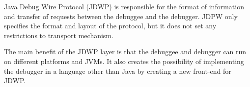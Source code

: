 \documentclass[..thesis.tex]{subfiles}
\begin{document}
Java Debug Wire Protocol (JDWP) is responsible for the format of information and transfer of requests between the debuggee and the debugger.
JDPW only specifies the format and layout of the protocol, but it does not set any restrictions to transport mechanism.
\cite{oracle_jpda_jdwp}

The main benefit of the JDWP layer is that the debuggee and debugger can run on different platforms and JVMs.
It also creates the possibility of implementing the debugger in a language other than Java by creating a new front-end for JDWP.
\end{document}
